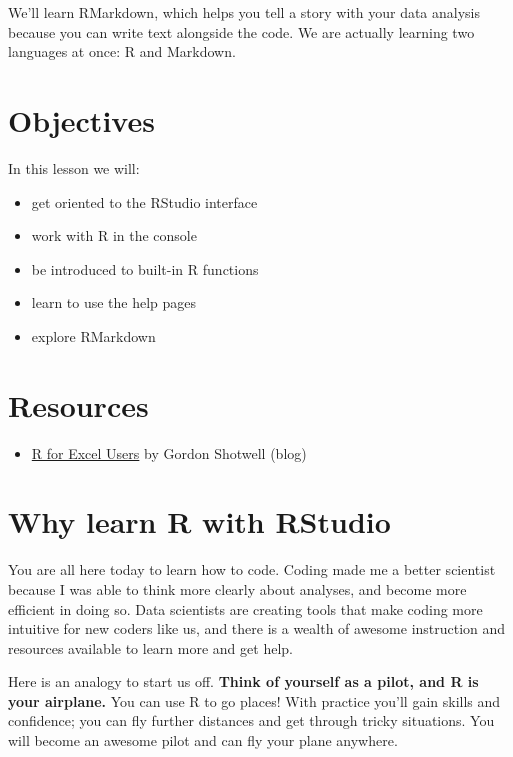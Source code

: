\documentclass[]{book}
\providecommand{\tightlist}{%
  \setlength{\itemsep}{0pt}\setlength{\parskip}{0pt}}
\begin{document}
We'll learn RMarkdown, which helps you tell a story with your data analysis because you can write text alongside the code. We are actually learning two languages at once: R and Markdown.

\hypertarget{objectives}{%
\section{Objectives}\label{objectives}}

In this lesson we will:

\begin{itemize}
\tightlist
\item
  get oriented to the RStudio interface
\item
  work with R in the console
\item
  be introduced to built-in R functions
\item
  learn to use the help pages
\item
  explore RMarkdown
\end{itemize}

\hypertarget{resources-1}{%
\section{Resources}\label{resources-1}}

\begin{itemize}
\tightlist
\item
  \href{https://blog.shotwell.ca/posts/r_for_excel_users/}{R for Excel Users} by Gordon Shotwell (blog)
\end{itemize}

\hypertarget{why-learn-r-with-rstudio}{%
\section{Why learn R with RStudio}\label{why-learn-r-with-rstudio}}

You are all here today to learn how to code. Coding made me a better scientist because I was able to think more clearly about analyses, and become more efficient in doing so. Data scientists are creating tools that make coding more intuitive for new coders like us, and there is a wealth of awesome instruction and resources available to learn more and get help.

Here is an analogy to start us off. \textbf{Think of yourself as a pilot, and R is your airplane.} You can use R to go places! With practice you'll gain skills and confidence; you can fly further distances and get through tricky situations. You will become an awesome pilot and can fly your plane anywhere.
\end{document}
